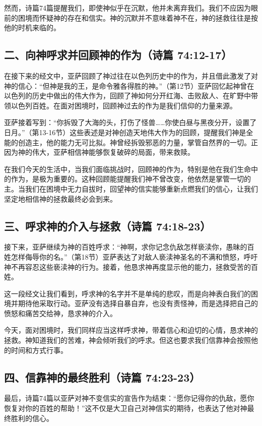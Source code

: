 \documentclass[a4paper, 12pt]{article}
\begin{document}
然而，诗篇74篇提醒我们，即使神似乎在沉默，他并未离弃我们。我们不应因为眼前的困境而怀疑神的存在和信实。神的沉默并不意味着神不在，神的拯救往往是按他的时机来临的。
\subsection*{二、向神呼求并回顾神的作为（诗篇 74:12-17）}
\hspace{0.6cm}在接下来的经文中，亚萨回顾了神过往在以色列历史中的作为，并且借此激发了对神的信心：“但神是我的王，是命令雅各得胜的神。”（第12节）亚萨回忆起神曾在以色列的历史中做出的伟大作为，回顾了神如何分开红海、击败敌人、在旷野中带领以色列百姓。在面对困境时，回顾神过去的作为是我们信仰的力量来源。

亚萨接着写到：“你拆毁了大海的头，打伤了怪兽……你使白昼与黑夜分开，设置了日月。”（第13-16节）这些表述是对神创造天地伟大作为的回顾，提醒我们神是全能的创造主，他的能力无可比拟。神曾经拆毁邪恶的力量，掌管自然界的一切。正因为神的伟大，亚萨相信神能够恢复破碎的局面，带来救赎。

在我们今天的生活中，当我们面临挑战时，回顾神的作为，特别是他在我们生命中的作为，是极为重要的。这种回顾能提醒我们神不曾改变，他依然是掌管一切的主。当我们在困境中无力自拔时，回望神的信实能够重新点燃我们的信心，让我们坚定地相信神的拯救最终必会到来。
\subsection*{三、呼求神的介入与拯救（诗篇 74:18-23）}
\hspace{0.6cm}接下来，亚萨继续为神的百姓呼求：“神啊，求你记念仇敌怎样亵渎你，愚昧的百姓怎样侮辱你的名。”（第18节）亚萨表达了对敌人亵渎神圣名的不满和愤怒，呼吁神不再容忍这些亵渎神的行为。接着，他恳求神再度显示他的能力，拯救受苦的百姓。

这一段经文让我们看到，呼求神的名字并不是单纯的悲叹，而是向神表白我们的困境并期待他采取行动。亚萨没有选择自暴自弃，也没有责怪神，而是选择把自己的愤怒和痛苦交给神，恳求神的介入。

今天，面对困境时，我们同样应当这样呼求神，带着信心和迫切的心情，恳求神的拯救。神知道我们的苦难，神会倾听我们的呼求。但这也要求我们信靠神会按照他的时间和方式行事。
\subsection*{四、信靠神的最终胜利（诗篇 74:23-23）}
\hspace{0.6cm}最后，诗篇74篇以亚萨对神不变信实的宣告作为结束：“愿你记得你的仇敌，愿你恢复对你的百姓的帮助！”这不仅是大卫自己对神信实的期待，也表达了他对神最终胜利的信心。
\end{document}
